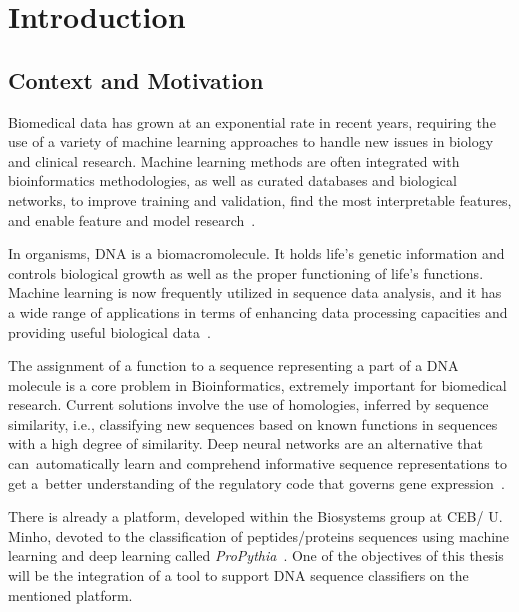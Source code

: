 \newcommand{\novathesis}{\emph{novathesis}}
\newcommand{\novathesisclass}{\texttt{novathesis.cls}}


\chapter{Introduction}
\label{cha:introduction}

\section{Context and Motivation} \label{sec:context_and_motivation}

Biomedical data has grown at an exponential rate in recent years, requiring the use of a variety of machine learning approaches to handle new issues in biology and clinical research. Machine learning methods are often integrated with bioinformatics methodologies, as well as curated databases and biological networks, to improve training and validation, find the most interpretable features, and enable feature and model research~\cite{Auslander2021IncorporatingFrameworks}.

In organisms, DNA is a biomacromolecule. It holds life's genetic information and controls biological growth as well as the proper functioning of life's functions. Machine learning is now frequently utilized in sequence data analysis, and it has a wide range of applications in terms of enhancing data processing capacities and providing useful biological data~\cite{Yang2020ReviewDNA}.

The assignment of a function to a sequence representing a part of a DNA molecule is a core problem in Bioinformatics, extremely important for biomedical research. Current solutions involve the use of homologies, inferred by sequence similarity, i.e., classifying new sequences based on known functions in sequences with a high degree of similarity. Deep neural networks are an alternative that can automatically learn and comprehend informative sequence representations to get a better understanding of the regulatory code that governs gene expression~\cite{Zrimec2021LearningExpression}.

There is already a platform, developed within the Biosystems group at CEB/ U. Minho, devoted to the classification of peptides/proteins sequences using machine learning and deep learning called \textit{ProPythia}~\cite{Sequeira2020ProPythia:Learning}. One of the objectives of this thesis will be the integration of a tool to support DNA sequence classifiers on the mentioned platform.

